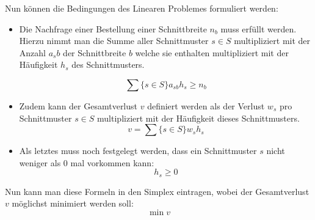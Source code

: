 Nun können die Bedingungen des Linearen Problemes formuliert werden:

\begin{itemize}
\item Die Nachfrage einer Bestellung einer Schnittbreite $n_b$ muss erfüllt werden. Hierzu nimmt man die Summe aller Schnittmuster $s \in S$ multipliziert mit der Anzahl $a_sb$ der Schnittbreite $b$ welche sie enthalten multipliziert mit der Häufigkeit $h_s$ des Schnittmusters.

\[ \sum\{s \in S\}a_{sb} h_s \geq n_b \]
\item Zudem kann der Gesamtverlust $v$ definiert werden als der Verlust $w_s$ pro Schnittmuster $s \in S$ multipliziert mit der Häufigkeit dieses Schnittmusters.
\[ v = \sum\{s \in S\}w_s h_s  \] 
\item Als letztes muss noch festgelegt werden, dass ein Schnittmuster $s$ nicht weniger als 0 mal vorkommen kann:
\[ h_s \geq 0 \]
\end{itemize}

Nun kann man diese Formeln in den Simplex eintragen, wobei der Gesamtverlust $v$ möglichst minimiert werden soll: 
\[ \min v \] 